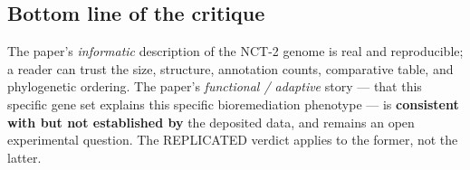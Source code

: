 \documentclass[11pt]{article}
\begin{document}
\subsection*{Bottom line of the critique}
The paper's \emph{informatic} description of the NCT-2 genome is real and reproducible; a reader can trust the size, structure, annotation counts, comparative table, and phylogenetic ordering. The paper's \emph{functional / adaptive} story --- that this specific gene set explains this specific bioremediation phenotype --- is \textbf{consistent with but not established by} the deposited data, and remains an open experimental question. The REPLICATED verdict applies to the former, not the latter.
\end{document}

